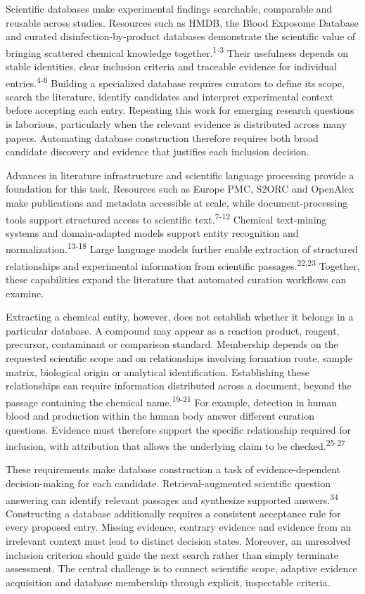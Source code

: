 \documentclass[
]{article}
\begin{document}
\newpage
Scientific databases make experimental findings searchable, comparable and reusable across studies. Resources such as HMDB, the Blood Exposome Database and curated disinfection-by-product databases demonstrate the scientific value of bringing scattered chemical knowledge together.\textsuperscript{1-3} Their usefulness depends on stable identities, clear inclusion criteria and traceable evidence for individual entries.\textsuperscript{4-6} Building a specialized database requires curators to define its scope, search the literature, identify candidates and interpret experimental context before accepting each entry. Repeating this work for emerging research questions is laborious, particularly when the relevant evidence is distributed across many papers. Automating database construction therefore requires both broad candidate discovery and evidence that justifies each inclusion decision.

Advances in literature infrastructure and scientific language processing provide a foundation for this task. Resources such as Europe PMC, S2ORC and OpenAlex make publications and metadata accessible at scale, while document-processing tools support structured access to scientific text.\textsuperscript{7-12} Chemical text-mining systems and domain-adapted models support entity recognition and normalization.\textsuperscript{13-18} Large language models further enable extraction of structured relationships and experimental information from scientific passages.\textsuperscript{22,23} Together, these capabilities expand the literature that automated curation workflows can examine.

Extracting a chemical entity, however, does not establish whether it belongs in a particular database. A compound may appear as a reaction product, reagent, precursor, contaminant or comparison standard. Membership depends on the requested scientific scope and on relationships involving formation route, sample matrix, biological origin or analytical identification. Establishing these relationships can require information distributed across a document, beyond the passage containing the chemical name.\textsuperscript{19-21} For example, detection in human blood and production within the human body answer different curation questions. Evidence must therefore support the specific relationship required for inclusion, with attribution that allows the underlying claim to be checked.\textsuperscript{25-27}

These requirements make database construction a task of evidence-dependent decision-making for each candidate. Retrieval-augmented scientific question answering can identify relevant passages and synthesize supported answers.\textsuperscript{34} Constructing a database additionally requires a consistent acceptance rule for every proposed entry. Missing evidence, contrary evidence and evidence from an irrelevant context must lead to distinct decision states. Moreover, an unresolved inclusion criterion should guide the next search rather than simply terminate assessment. The central challenge is to connect scientific scope, adaptive evidence acquisition and database membership through explicit, inspectable criteria.
\end{document}
